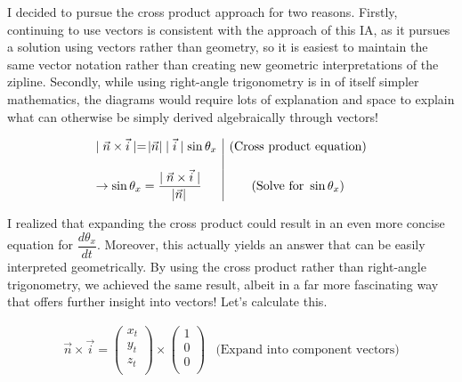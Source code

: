 \documentclass[12pt]{article}
\begin{document}
I decided to pursue the cross product approach for two reasons. Firstly, continuing to use vectors is consistent with the approach of this IA, as it pursues a solution using vectors rather than geometry, so it is easiest to maintain the same vector notation rather than creating new geometric interpretations of the zipline. Secondly, while using right-angle trigonometry is in of itself simpler mathematics, the diagrams would require lots of explanation and space to explain what can otherwise be simply derived algebraically through vectors!

$$
\begin{array}{l|c}
 \mid \vec n \times \vec i \mid = \abs{\vec n} \mid \vec i \mid \sin \theta_x & \text{(Cross product equation)}\\ \\
 \rightarrow \sin \theta_x = \dfrac{\mid \vec n \times \vec i \mid}{\abs{\vec n}} & \text{(Solve for } \sin \theta_x \text{)} \\
\end{array} 
$$

\vspace{20pt}

I realized that expanding the cross product could result in an even more concise equation for $\dfrac{d\theta_x}{dt}$. Moreover, this actually yields an answer that can be easily interpreted geometrically. By using the cross product rather than right-angle trigonometry, we achieved the same result, albeit in a far more fascinating way that offers further insight into vectors! Let's calculate this.

$$
\begin{array}{l|c}
 \vec n \times \vec i = \begin{pmatrix} x_t \\ y_t \\ z_t \\
\end{pmatrix} \times \begin{pmatrix} 1 \\ 0 \\ 0 \\
\end{pmatrix} & \text{(Expand into component vectors)}\\ \\
\end{array} 
$$
\end{document}
